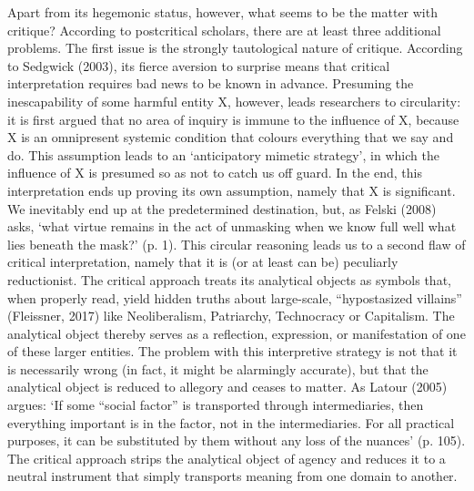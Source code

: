 \begin{adjmulticols}{2}{0mm}{0mm}
Apart from its hegemonic status, however, what seems to be the matter with critique? According to postcritical scholars, there are at least three additional problems. The first issue is the strongly tautological nature of critique. According to Sedgwick (2003), its fierce aversion to surprise means that critical interpretation requires bad news to be known in advance. Presuming the inescapability of some harmful entity X, however, leads researchers to circularity: it is first argued that no area of inquiry is immune to the influence of X, because X is an omnipresent systemic condition that colours everything that we say and do. This assumption leads to an ‘anticipatory mimetic strategy’, in which the influence of X is presumed so as not to catch us off guard. In the end, this interpretation ends up proving its own assumption, namely that X is significant. We inevitably end up at the predetermined destination, but, as Felski (2008) asks, ‘what virtue remains in the act of unmasking when we know full well what lies beneath the mask?’ (p. 1). This circular reasoning leads us to a second flaw of critical interpretation, namely that it is (or at least can be) peculiarly reductionist. The critical approach treats its analytical objects as symbols that, when properly read, yield hidden truths about large-scale, \enquote{hypostasized villains} (Fleissner, 2017) like Neoliberalism, Patriarchy, Technocracy or Capitalism. The analytical object thereby serves as a reflection, expression, or manifestation of one of these larger entities. The problem with this interpretive strategy is not that it is necessarily wrong (in fact, it might be alarmingly accurate), but that the analytical object is reduced to allegory and ceases to matter. As Latour (2005) argues: ‘If some “social factor” is transported through intermediaries, then everything important is in the factor, not in the intermediaries. For all practical purposes, it can be substituted by them without any loss of the nuances’ (p. 105). The critical approach strips the analytical object of agency and reduces it to a neutral instrument that simply transports meaning from one domain to another.


\end{adjmulticols}
